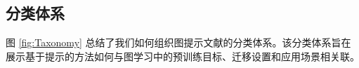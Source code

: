





\subsection{分类体系}

图 \ref{fig:Taxonomy} 总结了我们如何组织图提示文献的分类体系。该分类体系旨在展示基于提示的方法如何与图学习中的预训练目标、迁移设置和应用场景相关联。


